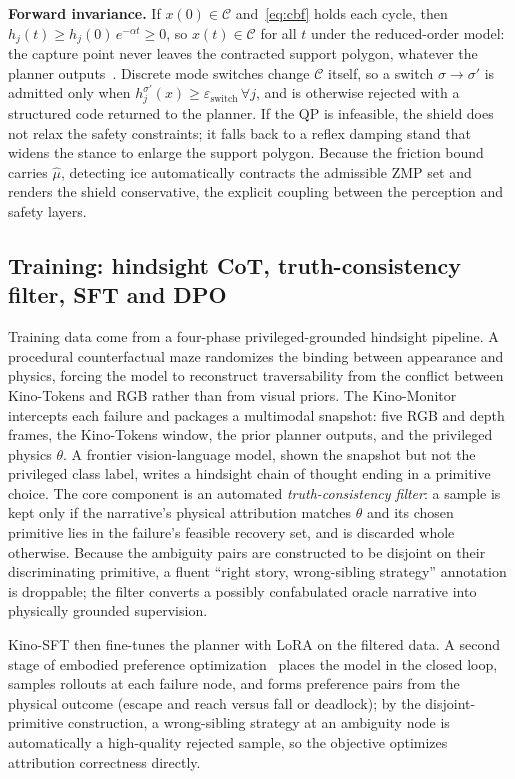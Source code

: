 \documentclass[conference]{IEEEtran}
\newcommand{\kinotokens}{Kino-Tokens}
\begin{document}
\textbf{Forward invariance.} If $x(0)\in\mathcal{C}$ and~\eqref{eq:cbf} holds each
cycle, then $h_j(t) \ge h_j(0)\,e^{-\alpha t} \ge 0$, so $x(t)\in\mathcal{C}$ for
all $t$ under the reduced-order model: the capture point never leaves the
contracted support polygon, whatever the planner
outputs~\cite{ames2017control,ames2019control}. Discrete mode switches change
$\mathcal{C}$ itself, so a switch $\sigma\!\to\!\sigma'$ is admitted only when
$h_j^{\sigma'}(x) \ge \varepsilon_{\mathrm{switch}}\,\forall j$, and is otherwise
rejected with a structured code returned to the planner. If the QP is infeasible,
the shield does not relax the safety constraints; it falls back to a reflex damping
stand that widens the stance to enlarge the support polygon. Because the friction
bound carries $\hat\mu$, detecting ice automatically contracts the admissible ZMP
set and renders the shield conservative, the explicit coupling between the
perception and safety layers.

\subsection{Training: hindsight CoT, truth-consistency filter, SFT and DPO}
\label{subsec:training}
Training data come from a four-phase privileged-grounded hindsight pipeline. A
procedural counterfactual maze randomizes the binding between appearance and
physics, forcing the model to reconstruct traversability from the conflict between
\kinotokens{} and RGB rather than from visual priors. The Kino-Monitor intercepts
each failure and packages a multimodal snapshot: five RGB and depth frames, the
\kinotokens{} window, the prior planner outputs, and the privileged physics
$\theta$. A frontier vision-language model, shown the snapshot but not the
privileged class label, writes a hindsight chain of thought ending in a primitive
choice. The core component is an automated \emph{truth-consistency filter}: a
sample is kept only if the narrative's physical attribution matches $\theta$ and
its chosen primitive lies in the failure's feasible recovery set, and is discarded
whole otherwise. Because the ambiguity pairs are constructed to be disjoint on
their discriminating primitive, a fluent ``right story, wrong-sibling strategy''
annotation is droppable; the filter converts a possibly confabulated oracle
narrative into physically grounded supervision.

Kino-SFT then fine-tunes the planner with LoRA on the filtered data. A second stage
of embodied preference optimization~\cite{rafailov2023dpo} places the model in the
closed loop, samples rollouts at each failure node, and forms preference pairs from
the physical outcome (escape and reach versus fall or deadlock); by the
disjoint-primitive construction, a wrong-sibling strategy at an ambiguity node is
automatically a high-quality rejected sample, so the objective optimizes
attribution correctness directly.
\end{document}
